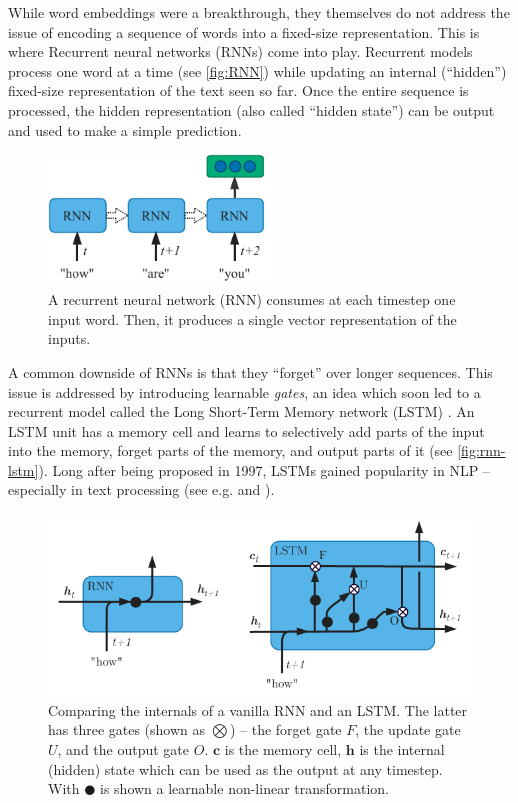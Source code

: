 \documentclass[bsc,frontabs,twoside,singlespacing,parskip,deptreport]{infthesis}
\begin{document}
{{    %
    While word embeddings were a breakthrough, they themselves do not address the issue of encoding a sequence of words into a fixed-size representation. This is where Recurrent neural networks (RNNs) \citep{Rumelhart_1986} come into play.
    Recurrent models process one word at a time (see \autoref{fig:RNN}) while updating an internal (``hidden'') fixed-size representation of the text seen so far.
    Once the entire sequence is processed, the hidden representation (also called ``hidden state'') can be output and used to make a simple prediction.
    \begin{figure}[h!t]
      \centering
      \includegraphics[width=6cm]{graphics/rnn}
      \caption{A recurrent neural network (RNN) consumes at each timestep one input word. Then, it produces a single vector representation of the inputs.}
      \label{fig:RNN}
    \end{figure}
    A common downside of RNNs is that they ``forget'' over longer sequences. This issue is addressed by introducing learnable \textit{gates}, an idea which soon led to a recurrent model called the Long Short-Term Memory network (LSTM) \citep{Hochreiter_Schmidhuber_1997}. An LSTM unit has a memory cell and learns to selectively add parts of the input into the memory, forget parts of the memory, and output parts of it (see \autoref{fig:rnn-lstm}). Long after being proposed in 1997, LSTMs gained popularity in NLP -- especially in text processing (see e.g. \citet{Mikolov_2010} and \citet{Graves_2013}). 
    \begin{figure}[h!t]
      \centering
      \includegraphics[width=13cm]{graphics/rnn-lstm}
      \caption{Comparing the internals of a vanilla RNN and an LSTM. The latter has three gates (shown as $\bigotimes$) -- the forget gate $F$, the update gate $U$, and the output gate $O$. $\bm{c}$ is the memory cell, $\bm{h}$ is the internal (hidden) state which can be used as the output at any timestep. With $\CIRCLE$ is shown a learnable non-linear transformation.}
      \label{fig:rnn-lstm}
    \end{figure}

}}
\end{document}
